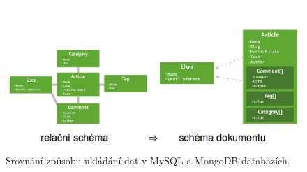 \begin{figure}[h]
\begin{centering}
\includegraphics[scale=0.3]{obrazky/schema-vs-documents}
\par\end{centering}
\caption{Srovnání způsobu ukládání dat v MySQL a MongoDB databázích. \cite{nosqlSlides}}
\end{figure}

